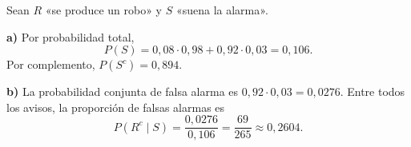 Sean $R$ «se produce un robo» y $S$ «suena la alarma».

\textbf{a)} Por probabilidad total,
\[
P(S)=0{,}08\cdot0{,}98+0{,}92\cdot0{,}03=0{,}106.
\]
Por complemento, $P(S^c)=\boxed{0{,}894}$.

\textbf{b)} La probabilidad conjunta de falsa alarma es $0{,}92\cdot0{,}03=0{,}0276$. Entre todos los avisos, la proporción de falsas alarmas es
\[
P(R^c\mid S)=\frac{0{,}0276}{0{,}106}
=\frac{69}{265}\approx\boxed{0{,}2604}.
\]
